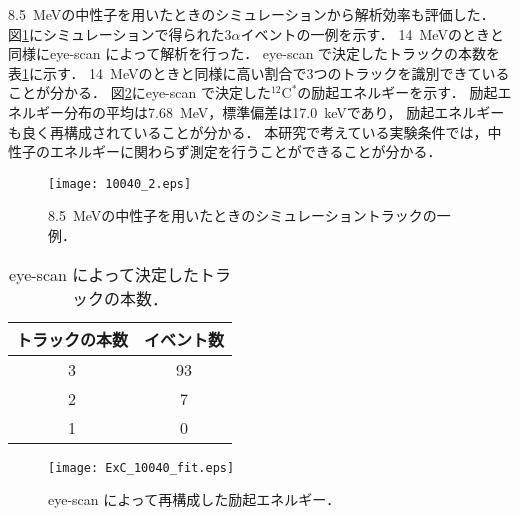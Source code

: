 \documentclass[../master]{subfiles}
\begin{document}
\SI{8.5}{\mega\electronvolt}の中性子を用いたときのシミュレーションから解析効率も評価した．
図\ref{fig::three_alpha_low_En}にシミュレーションで得られた3$\alpha$イベントの一例を示す．
\SI{14}{\mega\electronvolt}のときと同様にeye-scan によって解析を行った．
eye-scan で決定したトラックの本数を表\ref{tab::eye-scan_low}に示す．
\SI{14}{\mega\electronvolt}のときと同様に高い割合で3つのトラックを識別できていることが分かる．
図\ref{fig::ExC_low}にeye-scan で決定した${}^{12}\mathrm{C}^{*}$の励起エネルギーを示す．
励起エネルギー分布の平均は\SI{7.68}{\mega\electronvolt}，標準偏差は\SI{17.0}{\kilo\electronvolt}であり，
励起エネルギーも良く再構成されていることが分かる．
本研究で考えている実験条件では，中性子のエネルギーに関わらず測定を行うことができることが分かる．
\begin{figure}
  \centering
  \texttt{[image: 10040\_2.eps]}
  \caption{\SI{8.5}{\mega\electronvolt}の中性子を用いたときのシミュレーショントラックの一例．}
  \label{fig::three_alpha_low_En}
\end{figure}
\begin{table}
  \caption{eye-scan によって決定したトラックの本数．}
  \label{tab::eye-scan_low}
  \centering
  \begin{tabular}{cc}
    \toprule
    トラックの本数 & イベント数 \\
    \midrule
    3 & 93 \\
    2 & 7 \\
    1 & 0 \\
    \bottomrule
  \end{tabular}
\end{table}
\begin{figure}
  \centering
  \texttt{[image: ExC\_10040\_fit.eps]}
  \caption{eye-scan によって再構成した励起エネルギー．}
  \label{fig::ExC_low}
\end{figure}
\end{document}
